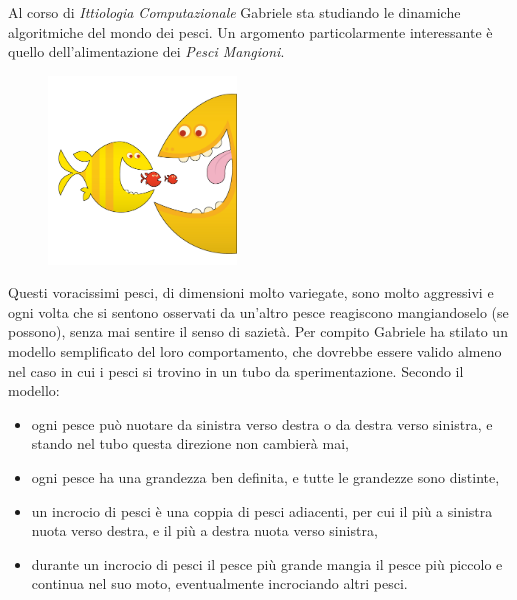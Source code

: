 \usepackage{pifont,mdframed}

\makeatletter
\gdef\this@inputfilename{input.txt}
\gdef\this@outputfilename{output.txt}
\makeatother

\newcommand{\inputfile}{\texttt{input.txt}}
\newcommand{\outputfile}{\texttt{output.txt}}

\newenvironment{warning}
  {\par\begin{mdframed}[linewidth=2pt,linecolor=gray]%
    \begin{list}{}{\leftmargin=1cm
                   \labelwidth=\leftmargin}\item[\Large\ding{43}]}
  {\end{list}\end{mdframed}\par}

Al corso di \emph{Ittiologia Computazionale} Gabriele sta studiando le dinamiche algoritmiche del mondo dei pesci. Un argomento particolarmente interessante è quello dell'alimentazione dei \emph{Pesci Mangioni}.

\begin{figure}
\centering\includegraphics[width=5cm]{pesci.jpg}
\end{figure}

Questi voracissimi pesci, di dimensioni molto variegate, sono molto aggressivi e ogni volta che si sentono osservati da un'altro pesce reagiscono mangiandoselo (se possono), senza mai sentire il senso di sazietà. Per compito Gabriele ha stilato un modello semplificato del loro comportamento, che dovrebbe essere valido almeno nel caso in cui i pesci si trovino in un tubo da sperimentazione. Secondo il modello:

\begin{itemize}[nolistsep, itemsep=2mm]
	\item ogni pesce può nuotare da sinistra verso destra o da destra verso sinistra, e stando nel tubo questa direzione non cambierà mai,
	\item ogni pesce ha una grandezza ben definita, e tutte le grandezze sono distinte,
	\item un incrocio di pesci è una coppia di pesci adiacenti, per cui il più a sinistra nuota verso destra, e il più a destra nuota verso sinistra,
	\item durante un incrocio di pesci il pesce più grande mangia il pesce più piccolo e continua nel suo moto, eventualmente incrociando altri pesci.
\end{itemize}

